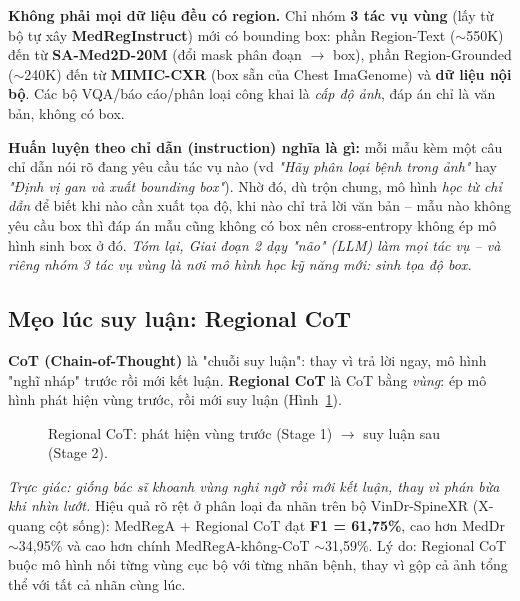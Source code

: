 \documentclass[12pt,a4paper,oneside]{extarticle}
\newcommand{\fact}[1]{#1}
\newcommand{\remark}[1]{\textit{#1}}
\newcommand{\important}[1]{\textbf{#1}}
\begin{document}
\fact{\textbf{Không phải mọi dữ liệu đều có region.} Chỉ nhóm \important{3 tác vụ vùng} (lấy từ bộ
tự xây \textbf{MedRegInstruct}) mới có bounding box: phần Region-Text ($\sim$550K) đến từ
\textbf{SA-Med2D-20M} (đổi mask phân đoạn $\to$ box), phần Region-Grounded ($\sim$240K) đến từ
\textbf{MIMIC-CXR} (box sẵn của Chest ImaGenome) và \textbf{dữ liệu nội bộ}. Các bộ VQA/báo
cáo/phân loại công khai là \emph{cấp độ ảnh}, đáp án chỉ là văn bản, không có box.}

\fact{\textbf{Huấn luyện theo chỉ dẫn (instruction) nghĩa là gì:} mỗi mẫu kèm một câu chỉ dẫn nói
rõ đang yêu cầu tác vụ nào (vd \emph{"Hãy phân loại bệnh trong ảnh"} hay \emph{"Định vị gan và
xuất bounding box"}). Nhờ đó, dù trộn chung, mô hình \emph{học từ chỉ dẫn} để biết khi nào cần
xuất tọa độ, khi nào chỉ trả lời văn bản -- mẫu nào không yêu cầu box thì đáp án mẫu cũng không có
box nên cross-entropy không ép mô hình sinh box ở đó.}
\remark{Tóm lại, Giai đoạn 2 dạy "não" (LLM) làm \emph{mọi} tác vụ -- và riêng nhóm 3 tác vụ vùng
là nơi mô hình học kỹ năng mới: sinh tọa độ box.}

\subsection{Mẹo lúc suy luận: Regional CoT}
\fact{\textbf{CoT (Chain-of-Thought)} là "chuỗi suy luận": thay vì trả lời ngay, mô hình "nghĩ
nháp" trước rồi mới kết luận. \textbf{Regional CoT} là CoT bằng \emph{vùng}: ép mô hình phát hiện
vùng trước, rồi mới suy luận (Hình~\ref{fig:cot}).}

\begin{figure}[H]
\centering
{}
\caption{Regional CoT: phát hiện vùng trước (Stage 1) $\to$ suy luận sau (Stage 2).}
\label{fig:cot}
\end{figure}

\remark{Trực giác: giống bác sĩ khoanh vùng nghi ngờ rồi mới kết luận, thay vì phán bừa khi nhìn
lướt.} \fact{Hiệu quả rõ rệt ở phân loại đa nhãn trên bộ VinDr-SpineXR (X-quang cột sống):
MedRegA + Regional CoT đạt \textbf{F1 = 61,75\%}, cao hơn MedDr $\sim$34,95\% và cao hơn chính
MedRegA-không-CoT $\sim$31,59\%. Lý do: Regional CoT buộc mô hình nối từng vùng cục bộ với từng
nhãn bệnh, thay vì gộp cả ảnh tổng thể với tất cả nhãn cùng lúc.}
\end{document}
